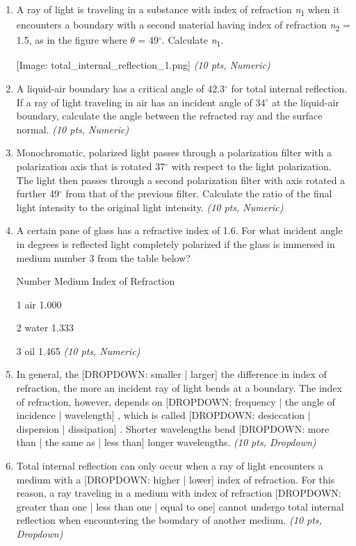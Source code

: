 \documentclass[11pt]{article}
\begin{document}
\begin{enumerate}[leftmargin=*]
Number
Wavelength (nm)
Index of Refraction

1
400
1.531

2
475
1.523

3
550
1.519

4
625
1.515 \hfill \textit{(10 pts, Numeric)}

  \item A ray of light is traveling in a substance with index of refraction \emph{n}\textsubscript{1} when it encounters a boundary with a second material having index of refraction \emph{n}\textsubscript{2} = 1.5, as in the figure where $\theta$ = 49$^{\circ}$. Calculate \emph{n}\textsubscript{1}.

[Image: total\_internal\_reflection\_1.png] \hfill \textit{(10 pts, Numeric)}

  \item A liquid-air boundary has a critical angle of 42.3$^{\circ}$ for total internal reflection. If a ray of light traveling in air has an incident angle of 34$^{\circ}$ at the liquid-air boundary, calculate the angle between the refracted ray and the surface normal. \hfill \textit{(10 pts, Numeric)}

  \item Monochromatic, polarized light passes through a polarization filter with a polarization axis that is rotated 37$^{\circ}$ with respect to the light polarization. The light then passes through a second polarization filter with axis rotated a further 49$^{\circ}$ from that of the previous filter. Calculate the ratio of the final light intensity to the original light intensity. \hfill \textit{(10 pts, Numeric)}

  \item A certain pane of glass has a refractive index of 1.6. For what incident angle in degrees is reflected light completely polarized if the glass is immersed in medium number 3 from the table below?

Number
Medium
Index of Refraction

1
air
1.000

2
water
1.333

3
oil
1.465 \hfill \textit{(10 pts, Numeric)}

  \item In general, the [DROPDOWN: smaller | larger]
the difference in index of refraction, the more an incident ray of light bends at a boundary. The index of refraction, however, depends on [DROPDOWN: frequency | the angle of incidence | wavelength]
, which is called [DROPDOWN: desiccation | dispersion | dissipation]
. Shorter wavelengths bend [DROPDOWN: more than | the same as | less than]
longer wavelengths. \hfill \textit{(10 pts, Dropdown)}

  \item Total internal reflection can only occur when a ray of light encounters a medium with a [DROPDOWN: higher | lower]
index of refraction. For this reason, a ray traveling in a medium with index of refraction [DROPDOWN: greater than one | less than one | equal to one]
cannot undergo total internal reflection when encountering the boundary of another medium. \hfill \textit{(10 pts, Dropdown)}

\end{enumerate}
\end{document}
